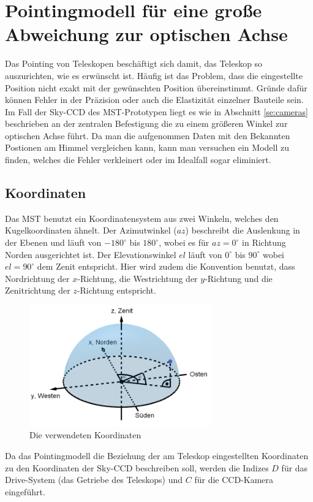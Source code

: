 \chapter{Pointingmodell für eine große Abweichung zur optischen Achse}
\label{ch:pointing}
Das Pointing von Teleskopen beschäftigt sich damit, das Teleskop so auszurichten, wie es erwünscht ist. Häufig ist das Problem, dass die eingestellte Position nicht exakt mit der gewünschten Position übereinstimmt. Gründe dafür können Fehler in der Präzision oder auch die Elastizität einzelner Bauteile sein. Im Fall der Sky-CCD des MST-Prototypen liegt es wie in Abschnitt \ref{se:cameras} beschrieben an der zentralen Befestigung die zu einem größeren Winkel zur optischen Achse führt. Da man die aufgenommen Daten mit den Bekannten Postionen am Himmel vergleichen kann, kann man versuchen ein Modell zu finden, welches die Fehler verkleinert oder im Idealfall sogar eliminiert.

\section{Koordinaten}
Das MST benutzt ein Koordinatensystem aus zwei Winkeln, welches den Kugelkoordinaten ähnelt. Der Azimutwinkel ($az$) beschreibt die Auslenkung in der Ebenen und läuft von $-180^{\circ}$ bis $180^{\circ}$, wobei es für $az=0^{\circ}$ in Richtung Norden ausgerichtet ist. Der Elevationswinkel $el$ läuft von $0^{\circ}$ bis $90^{\circ}$ wobei $el=90^{\circ}$ dem Zenit entspricht. Hier wird zudem die Konvention benutzt, dass Nordrichtung der $x$-Richtung, die Westrichtung der $y$-Richtung und die Zenitrichtung der $z$-Richtung entspricht.
\begin{figure}[htbp]
\centering
\includegraphics[width=0.7\textwidth]{Images/coordinates.png}
\caption{Die verwendeten Koordinaten}
\label{img:coordinates}
\end{figure}
Da das Pointingmodell die Beziehung der am Teleskop eingestellten Koordinaten zu den Koordinaten der Sky-CCD beschreiben soll, werden die Indizes $D$ für das Drive-System (das Getriebe des Teleskops) und $C$ für die CCD-Kamera eingeführt.

